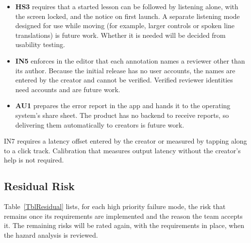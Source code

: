 \documentclass{article}
\begin{document}
\begin{itemize}
  \item \textbf{HS3} requires that a started lesson can be followed by
        listening alone, with the screen locked, and the notice on first
        launch. A separate listening mode designed for use while moving (for
        example, larger controls or spoken line translations) is future work.
        Whether it is needed will be decided from usability testing.
  \item \textbf{IN5} enforces in the editor that each annotation names a
        reviewer other than its author. Because the initial release has no
        user accounts, the names are entered by the creator and cannot be
        verified. Verified reviewer identities need accounts and are future
        work.
  \item \textbf{AU1} prepares the error report in the app and hands it to the
        operating system's share sheet. The product has no backend to receive
        reports, so delivering them automatically to creators is future work.
\end{itemize}

IN7 requires a latency offset entered by the creator or measured by tapping
along to a click track. Calibration that measures output latency without the
creator's help is not required.

\subsection{Residual Risk}

Table~\ref{TblResidual} lists, for each high priority failure mode, the risk
that remains once its requirements are implemented and the reason the team
accepts it. The remaining risks will be rated again, with the requirements in
place, when the hazard analysis is reviewed.
\end{document}
